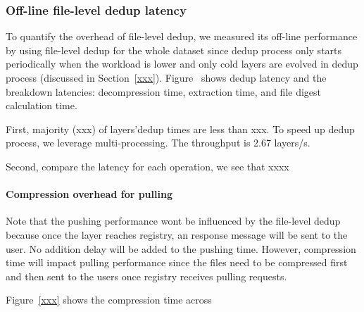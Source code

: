 \subsubsection{Off-line file-level dedup latency} 
To quantify the overhead of file-level dedup, we measured its off-line performance by using file-level dedup for the whole dataset since dedup process only starts periodically when the workload is lower and only cold layers are evolved in dedup process (discussed in Section~\ref{xxx}). Figure~\cite{xxx} shows dedup latency and the breakdown latencies: decompression time, extraction time, and file digest calculation time.

First, majority (xxx) of layers'dedup times are less than xxx.
To speed up dedup process, we leverage multi-processing. The throughput is 2.67 layers/s. 

Second, compare the latency for each operation, we see that xxxx

 
\paragraph{Compression overhead for pulling}Note that the pushing performance wont be influenced by the file-level dedup because once the layer reaches registry, an response message will be sent to the user. No addition delay will be added to the pushing time. However, compression time will impact pulling performance since the files need to be compressed first and then sent to the users once registry receives pulling requests. 

Figure~\ref{xxx} shows the compression time across 

